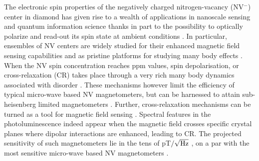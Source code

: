 \documentclass[preprintnumbers,amsmath,amssymb,superscriptaddress,twocolumn,showpacs]{revtex4-2}
\begin{document}
%

The electronic spin properties of the negatively charged nitrogen-vacancy (NV$^-$) center in diamond has given rise to a wealth of applications in nanoscale sensing and quantum information science thanks in part to the possibility to optically polarize and read-out its spin state at ambient conditions \cite{DOHERTY20131}. In particular, ensembles of NV centers are widely studied for their enhanced magnetic field sensing capabilities \cite{Acosta, TALLAIRE2020421,edmonds2021characterisation, chatzidrosos2021fiberized} and as pristine platforms for studying many body effects \citep{kucsko2018critical, ChoiNat, ZuYao}. When the NV spin concentration reaches ppm values, spin depolarisation, or cross-relaxation (CR) takes place through a very rich many body dynamics associated with disorder \citep{choi_observation_2017}. These mechanisms however limit the efficiency of typical micro-wave based NV magnetometers, but can be harnessed to attain sub-heisenberg limited magnetometers \citep{zhou2020quantum}. Further, cross-relaxation mechanisms can be turned as a tool for magnetic field sensing \cite{akhmedzhanov_microwave-free_2017, akhmedzhanov_magnetometry_2019}. 
Spectral features in the photoluminescence indeed appear when the magnetic field crosses specific crystal planes where dipolar interactions are enhanced, leading to CR. The projected sensitivity of such magnetometers lie in the tens of pT$/\sqrt{\rm Hz}$  \cite{akhmedzhanov_microwave-free_2017}, on a par with the most sensitive micro-wave based NV magnetometers \cite{Wolf, Sturner}. 
\end{document}
